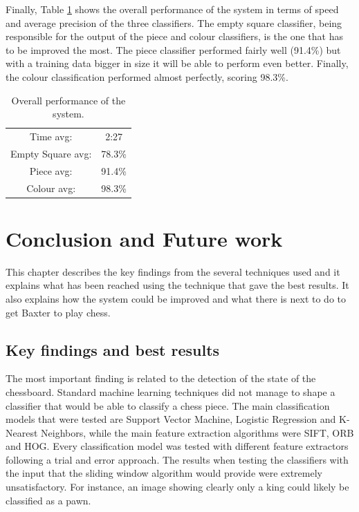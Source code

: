 \documentclass{l4proj}
\begin{document}
\vspace*{17mm}
Finally, Table \ref{table:finalTable} shows the overall performance of the system in terms of speed and average precision of the three classifiers. The empty square classifier, being responsible for the output of the piece and colour classifiers, is the one that has to be improved the most. The piece classifier performed fairly well (91.4\%) but with a training data bigger in size it will be able to perform even better. Finally, the colour classification performed almost perfectly, scoring 98.3\%. 


\vspace{10mm}
\begin{table}[h!]
\centering
\begin{tabular}{|c|c|}
	\hline
	Time avg: & 2:27 \\
	\rowcolor{brown!45}Empty Square avg: & 78.3\%  \\
	Piece avg: & 91.4\% \\
	\rowcolor{brown!45} Colour avg: & 98.3\% \\
	\hline
\end{tabular}
	\caption{Overall performance of the system.}
	\label{table:finalTable}
\end{table}


\chapter{Conclusion and Future work} \label{Conclusion}

This chapter describes the key findings from the several techniques used and it explains what has been reached using the technique that gave the best results. It also explains how the system could be improved and what there is next to do to get Baxter to play chess.


\section{Key findings and best results}

The most important finding is related to the detection of the state of the chessboard. Standard machine learning techniques did not manage to shape a classifier that would be able to classify a chess piece. The main classification models that were tested are Support Vector Machine, Logistic Regression and K-Nearest Neighbors, while the main feature extraction algorithms were SIFT, ORB and HOG. Every classification model was tested with different feature extractors following a trial and error approach. The results when testing the classifiers with the input that the sliding window algorithm would provide were extremely unsatisfactory. For instance, an image showing clearly only a king could likely be classified as a pawn. 
\end{document}
